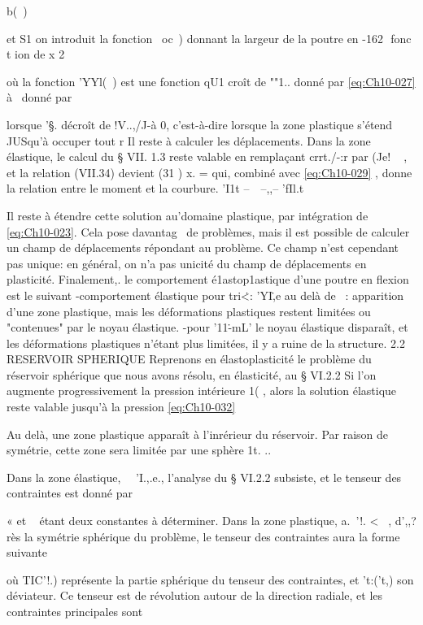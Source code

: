 {{{b(~) 

et S1 on introduit la fonction ~oc~) donnant la largeur de la poutre en 
-162 ­
fonc t ion de x
2 

où la fonction 'YYl(~) est une fonction qU1 croît de ""1.. donné par \eqref{eq:Ch10-027} à ~donné par 

lorsque '§. décroît de !V..,/J-à 0, c'est-à-dire lorsque la zone plastique s'étend JUS­qu'à occuper tout r 
Il reste à calculer les déplacements. Dans la zone élastique, le calcul du § VII. 1.3 reste valable en remplaçant crrt./-:r par (Je! ~ , et la re­lation (VII.34) devient 
(31 ) 
x. = 
qui, combiné avec \eqref{eq:Ch10-029} , donne la relation entre le moment et la courbure. 
'I1t --~~--,,--­
'fIl.t 


Il reste à étendre cette solution au'domaine plastique, par inté­gration de \eqref{eq:Ch10-023}. Cela pose davantag~ de problèmes, mais il est possible de calculer un champ de déplacements répondant au problème. Ce champ n'est ce­pendant pas unique: en général, on n'a pas unicité du champ de déplacements en plasticité. 
Finalement,. le comportement é1astop1astique d'une poutre en flexion 
est le suivant 
-comportement élastique pour tri\. <: 'YI\.,e au delà de ~: apparition d'une zone plastique, mais les déformations plastiques restent limitées ou "contenues" par le noyau élastique. 
-pour '11\.-mL' le noyau élastique disparaît, et les déformations plas­tiques n'étant plus limitées, il y a ruine de la structure. 
2.2 RESERVOIR SPHERIQUE 
Reprenons en élastoplasticité le problème du réservoir sphérique que nous avons résolu, en élasticité, au § VI.2.2 Si l'on augmente pro­gressivement la pression intérieure 1( , alors la solution élastique reste valable jusqu'à la pression 
\eqref{eq:Ch10-032} 

Au delà, une zone plastique apparaît à l'inrérieur du réservoir. Par raison 
de symétrie, cette zone sera 
limitée par une sphère 1t. .. ~ 

Dans la zone élastique, ~~'I.,.e., l'analyse du § VI.2.2 subsiste, et le ten­seur des contraintes est donné par 


« et ~ étant deux constantes à déterminer. Dans la zone plastique, a.~'!. <~ , d',,?rès la symétrie sphérique du problème, le tenseur des contraintes aura la forme suivante 

où TIC'!.) représente la partie sphérique du tenseur des contraintes, et 't:('t,) son déviateur. Ce tenseur est de révolution autour de la direction radiale, et les contraintes principales sont 

}}}
